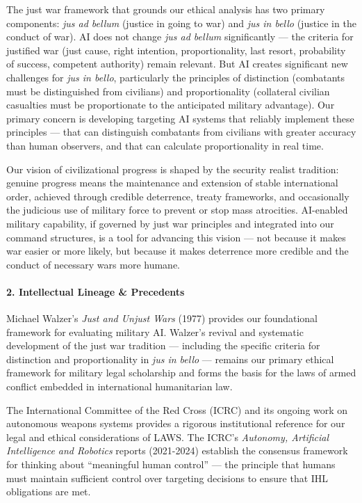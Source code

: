 The just war framework that grounds our ethical analysis has two primary
components: \emph{jus ad bellum} (justice in going to war) and \emph{jus
in bello} (justice in the conduct of war). AI does not change \emph{jus
ad bellum} significantly --- the criteria for justified war (just cause,
right intention, proportionality, last resort, probability of success,
competent authority) remain relevant. But AI creates significant new
challenges for \emph{jus in bello}, particularly the principles of
distinction (combatants must be distinguished from civilians) and
proportionality (collateral civilian casualties must be proportionate to
the anticipated military advantage). Our primary concern is developing
targeting AI systems that reliably implement these principles --- that
can distinguish combatants from civilians with greater accuracy than
human observers, and that can calculate proportionality in real time.

Our vision of civilizational progress is shaped by the security realist
tradition: genuine progress means the maintenance and extension of
stable international order, achieved through credible deterrence, treaty
frameworks, and occasionally the judicious use of military force to
prevent or stop mass atrocities. AI-enabled military capability, if
governed by just war principles and integrated into our command
structures, is a tool for advancing this vision --- not because it makes
war easier or more likely, but because it makes deterrence more credible
and the conduct of necessary wars more humane.

\paragraph{2. Intellectual Lineage \&
Precedents}\label{intellectual-lineage-precedents-23}

Michael Walzer's \emph{Just and Unjust Wars} (1977) provides our
foundational framework for evaluating military AI. Walzer's revival and
systematic development of the just war tradition --- including the
specific criteria for distinction and proportionality in \emph{jus in
bello} --- remains our primary ethical framework for military legal
scholarship and forms the basis for the laws of armed conflict embedded
in international humanitarian law.

The International Committee of the Red Cross (ICRC) and its ongoing work
on autonomous weapons systems provides a rigorous institutional
reference for our legal and ethical considerations of LAWS. The ICRC's
\emph{Autonomy, Artificial Intelligence and Robotics} reports
(2021-2024) establish the consensus framework for thinking about
``meaningful human control'' --- the principle that humans must maintain
sufficient control over targeting decisions to ensure that IHL
obligations are met.

